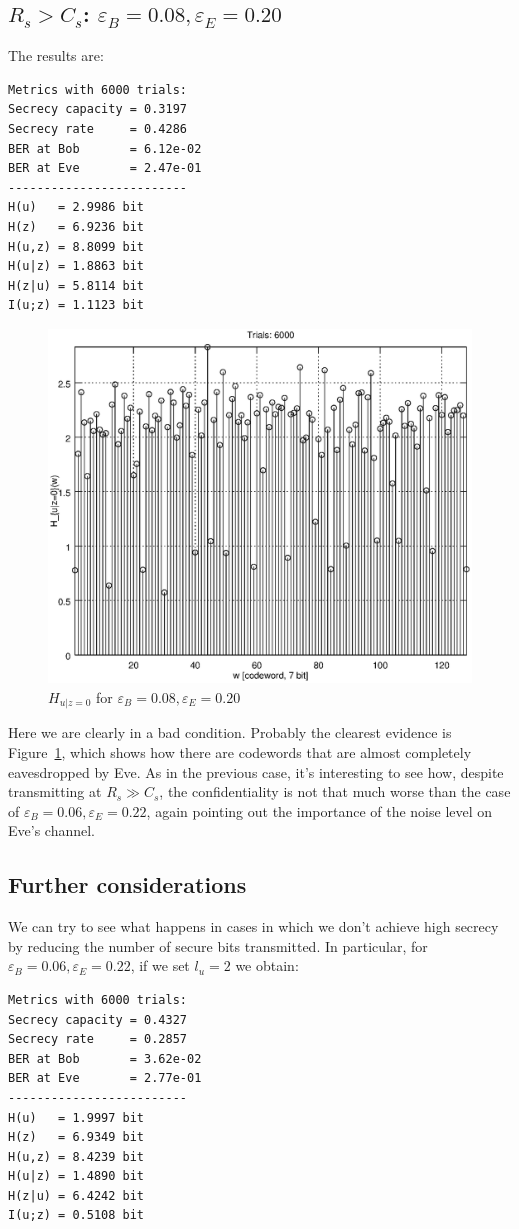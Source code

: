 \documentclass[a4paper,12pt,titlepage]{article}
\begin{document}
\subsection*{$R_s > C_s$: $\varepsilon_B = 0.08, \varepsilon_E = 0.20$}
The results are:
\begin{verbatim}
Metrics with 6000 trials:
Secrecy capacity = 0.3197
Secrecy rate     = 0.4286
BER at Bob       = 6.12e-02
BER at Eve       = 2.47e-01
-------------------------
H(u)   = 2.9986 bit
H(z)   = 6.9236 bit
H(u,z) = 8.8099 bit
H(u|z) = 1.8863 bit
H(z|u) = 5.8114 bit
I(u;z) = 1.1123 bit
\end{verbatim}

\begin{figure}[h]
  \centering
  \includegraphics[scale=0.8]{bsc__0_080_0_200__6000.eps}
  \caption{$H_{u|z=0}$ for $\varepsilon_B = 0.08, \varepsilon_E = 0.20$}
  \label{fig:bsc_0.08_0.20}
\end{figure}

Here we are clearly in a bad condition. Probably the clearest evidence is
Figure~\ref{fig:bsc_0.08_0.20}, which shows how there are codewords that are
almost completely eavesdropped by Eve. As in the previous case, it's
interesting to see how, despite transmitting at $R_s \gg C_s$, the
confidentiality is not that much worse than the case of $\varepsilon_B = 0.06,
\varepsilon_E = 0.22$, again pointing out the importance of the noise level
on Eve's channel.

\subsection*{Further considerations}
We can try to see what happens in cases in which we don't achieve high secrecy
by reducing the number of secure bits transmitted. In particular, for
$\varepsilon_B = 0.06, \varepsilon_E = 0.22$, if we set $l_u = 2$ we obtain:
\begin{verbatim}
Metrics with 6000 trials:
Secrecy capacity = 0.4327
Secrecy rate     = 0.2857
BER at Bob       = 3.62e-02
BER at Eve       = 2.77e-01
-------------------------
H(u)   = 1.9997 bit
H(z)   = 6.9349 bit
H(u,z) = 8.4239 bit
H(u|z) = 1.4890 bit
H(z|u) = 6.4242 bit
I(u;z) = 0.5108 bit
\end{verbatim}
\end{document}
